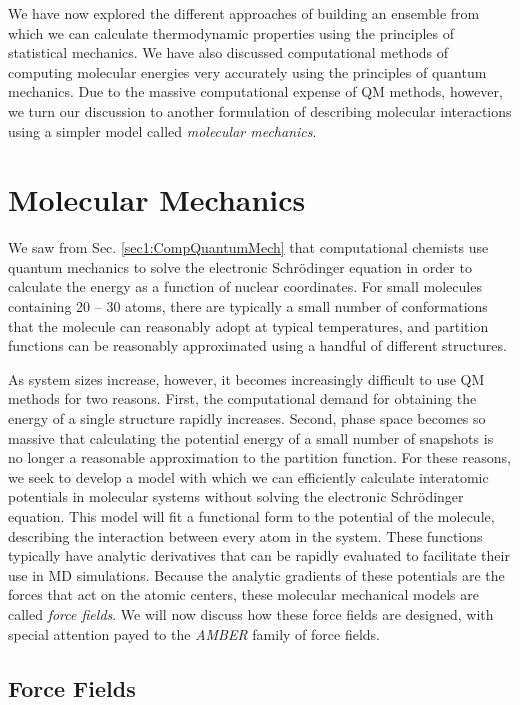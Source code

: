 We have now explored the different approaches of building an ensemble from which
we can calculate thermodynamic properties using the principles of statistical
mechanics. We have also discussed computational methods of computing molecular
energies very accurately using the principles of quantum mechanics. Due to the
massive computational expense of QM methods, however, we turn our discussion to
another formulation of describing molecular interactions using a simpler model
called \emph{molecular mechanics}.

\section{Molecular Mechanics}

We saw from Sec. \ref{sec1:CompQuantumMech} that computational chemists use
quantum mechanics to solve the electronic Schr\"odinger equation in order to
calculate the energy as a function of nuclear coordinates. For small molecules
containing 20 -- 30 atoms, there are typically a small number of conformations
that the molecule can reasonably adopt at typical temperatures, and partition
functions can be reasonably approximated using a handful of different
structures.

As system sizes increase, however, it becomes increasingly difficult to use QM
methods for two reasons. First, the computational demand for obtaining the
energy of a single structure rapidly increases. Second, phase space becomes so
massive that calculating the potential energy of a small number of snapshots is
no longer a reasonable approximation to the partition function. For these
reasons, we seek to develop a model with which we can efficiently calculate
interatomic potentials in molecular systems without solving the electronic
Schr\"odinger equation. This model will fit a functional form to the potential
of the molecule, describing the interaction between every atom in the system.
These functions typically have analytic derivatives that can be rapidly
evaluated to facilitate their use in MD simulations. Because the analytic
gradients of these potentials are the forces that act on the atomic centers,
these molecular mechanical models are called \emph{force fields}. We will now
discuss how these force fields are designed, with special attention payed to the
\emph{AMBER} family of force fields.

\subsection{Force Fields}

